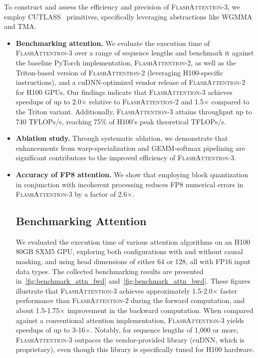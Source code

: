 To construct and assess the efficiency and precision of \textsc{FlashAttention-3}, we employ CUTLASS~\citep{Thakkar_CUTLASS_2023} primitives, specifically leveraging abstractions like WGMMA and TMA.

\begin{itemize}

\item \textbf{Benchmarking attention.} We evaluate the execution time of \textsc{FlashAttention-3} over a range of sequence lengths and benchmark it against the baseline PyTorch implementation, \textsc{FlashAttention-2}, as well as the Triton-based version of \textsc{FlashAttention-2} (leveraging H100-specific instructions), and a cuDNN-optimized vendor release of \textsc{FlashAttention-2} for H100 GPUs. Our findings indicate that \textsc{FlashAttention-3} achieves speedups of up to 2.0$\times$ relative to \textsc{FlashAttention-2} and 1.5$\times$ compared to the Triton variant. Additionally, \textsc{FlashAttention-3} attains throughput up to 740 TFLOPs/s, reaching 75\% of H100’s peak theoretical TFLOPs/s.
\item \textbf{Ablation study.} Through systematic ablation, we demonstrate that enhancements from warp-specialization and GEMM-softmax pipelining are significant contributors to the improved efficiency of \textsc{FlashAttention-3}.
\item \textbf{Accuracy of FP8 attention.} We show that employing block quantization in conjunction with incoherent processing reduces FP8 numerical errors in \textsc{FlashAttention-3} by a factor of 2.6$\times$.

\subsection{Benchmarking Attention}
\label{subsec:benchmark_attn}

We evaluated the execution time of various attention algorithms on an H100 80GB SXM5 GPU, exploring both configurations with and without causal masking, and using head dimensions of either 64 or 128, all with FP16 input data types. The collected benchmarking results are presented in~\cref{fig:benchmark_attn_fwd} and~\cref{fig:benchmark_attn_bwd}. These figures illustrate that \textsc{FlashAttention-3} achieves approximately 1.5-2.0$\times$ faster performance than \textsc{FlashAttention-2} during the forward computation, and about 1.5-1.75$\times$ improvement in the backward computation. When compared against a conventional attention implementation, \textsc{FlashAttention-3} yields speedups of up to 3-16$\times$. Notably, for sequence lengths of 1,000 or more, \textsc{FlashAttention-3} outpaces the vendor-provided library (cuDNN, which is proprietary), even though this library is specifically tuned for H100 hardware.


\end{itemize}

